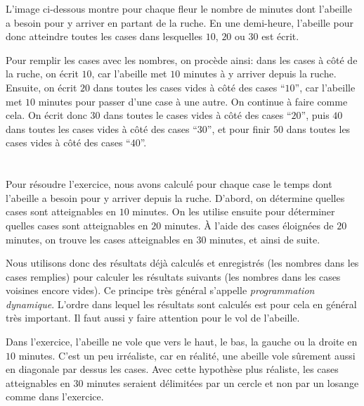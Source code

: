{{{\centering%
\par}

L’image ci-dessous montre pour chaque fleur le nombre de minutes dont l’abeille a besoin pour y arriver en partant de la ruche. En une demi-heure, l’abeille pour donc atteindre toutes les cases dans lesquelles $10$, $20$ ou $30$ est écrit.

{\centering%
\par}

Pour remplir les cases avec les nombres, on procède ainsi: dans les cases à côté de la ruche, on écrit $10$, car l’abeille met $10$ minutes à y arriver depuis la ruche. Ensuite, on écrit $20$ dans toutes les cases vides à côté des cases “$10$”, car l’abeille met $10$ minutes pour passer d’une case à une autre. On continue à faire comme cela. On écrit donc $30$ dans toutes le cases vides à côté des cases “$20$”, puis $40$ dans toutes les cases vides à côté des cases “$30$”, et pour finir $50$ dans toutes les cases vides à côté des cases “$40$”.



\section*{\BrochureItsInformatics}
Pour résoudre l’exercice, nous avons calculé pour chaque case le temps dont l’abeille a besoin pour y arriver depuis la ruche. D’abord, on détermine quelles cases sont atteignables en $10$ minutes. On les utilise ensuite pour déterminer quelles cases sont atteignables en $20$ minutes. À l’aide des cases éloignées de $20$ minutes, on trouve les cases atteignables en $30$ minutes, et ainsi de suite.

Nous utilisons donc des résultats déjà calculés et enregistrés (les nombres dans les cases remplies) pour calculer les résultats suivants (les nombres dans les cases voisines encore vides). Ce principe très général s’appelle \emph{programmation dynamique}. L’ordre dans lequel les résultats sont calculés est pour cela en général très important. Il faut aussi y faire attention pour le vol de l’abeille.

Dans l’exercice, l’abeille ne vole que vers le haut, le bas, la gauche ou la droite en $10$ minutes. C’est un peu irréaliste, car en réalité, une abeille vole sûrement aussi en diagonale par dessus les cases. Avec cette hypothèse plus réaliste, les cases atteignables en $30$ minutes seraient délimitées par un cercle et non par un losange comme dans l’exercice.

}}
